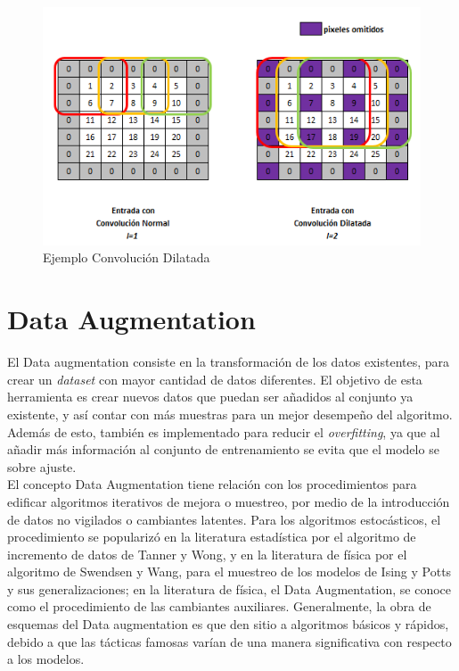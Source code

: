 \begin{figure}[ht]
	\centering
	\includegraphics[scale=0.6]{Figs/Convolucion_dilatada.png}
	\caption{Ejemplo Convolución Dilatada}
	\label{fig:cd}
\end{figure}


\section{Data Augmentation}
El Data augmentation consiste en la transformación de los datos existentes, para crear un \textit{dataset} con mayor cantidad de datos diferentes. El objetivo de esta herramienta es crear nuevos datos que puedan ser añadidos al conjunto ya existente, y así contar con más muestras para un mejor desempeño del algoritmo. Además de esto, también es implementado para reducir el \textit{overfitting}, ya que al añadir más información al conjunto de entrenamiento se evita que el modelo se sobre ajuste. \\


El concepto Data Augmentation tiene relación con los procedimientos para edificar algoritmos iterativos de mejora o muestreo, por medio de la introducción de datos no vigilados o cambiantes latentes. Para los algoritmos estocásticos, el procedimiento se popularizó en la literatura estadística por el algoritmo de incremento de datos de Tanner y Wong, y en la literatura de física por el algoritmo de Swendsen y Wang, para el muestreo de los modelos de Ising y Potts y sus generalizaciones; en la literatura de física, el Data Augmentation, se conoce como el procedimiento de las cambiantes auxiliares. Generalmente, la obra de esquemas del Data augmentation es que den sitio a algoritmos básicos y rápidos, debido a que las tácticas famosas varían de una manera significativa con respecto a los modelos.\cite{van2001art}

